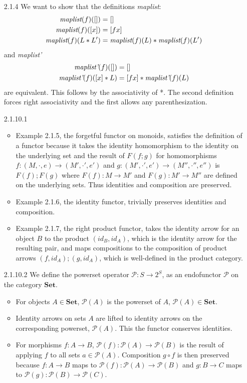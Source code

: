 \documentclass{article}
\newcommand{\pow}{\mathcal{P}}
\newcommand{\fpow}{\mathbf{\mathcal{P}}}
\newcommand{\cset}{\mathbf{Set}}
\begin{document}
\begin{enumerate}
\item[2.1.4]
  We want to show that the definitions \emph{maplist}:
  \begin{align*}
    \emph{maplist}(f)([]) &= []
    \\ \emph{maplist}(f)([x]) &= [f x]
    \\ \emph{maplist}(f)(L * L') &= \emph{maplist}(f)(L) * \emph{maplist}(f)(L')
  \end{align*}
  and \emph{maplist'}
  \begin{align*}
    \emph{maplist'}(f)([]) &= []
    \\ \emph{maplist'}(f)([x] * L) &= [f x] * \emph{maplist'}(f)(L)
  \end{align*}
  are equivalent.
  This follows by the associativity of *.
  The second definition forces right associativity and the first allows any parenthesization.

\item[2.1.10.1]
  \begin{itemize}
  \item Example 2.1.5, the forgetful functor on monoids, satisfies the definition of a functor because it takes the identity homomorphism to the identity on the underlying set and the result of $F (f;g)$ for homomorphisms $f : (M,\cdot,e) \rightarrow (M',\cdot',e')$ and $g : (M',\cdot', e') \rightarrow (M'',\cdot'',e'')$ is $F(f); F(g)$ where $F(f) : M \rightarrow M'$ and $F(g) : M' \rightarrow M''$ are defined on the underlying sets. 
    Thus identities and composition are preserved.
  \item Example 2.1.6, the identity functor, trivially preserves identities and composition.
  \item Example 2.1.7, the right product functor, takes the identity arrow for an object $B$ to the product $(id_B, id_A)$, which is the identity arrow for the resulting pair, and maps compositions to the composition of product arrows $(f,id_A); (g,id_A)$, which is well-defined in the product category.
  \end{itemize}

\item[]
\item [2.1.10.2]
  We define the powerset operator $\pow : S \rightarrow 2^S$, as an endofunctor $\fpow$ on the category $\cset$.
  \begin{itemize}
  \item For objects $A \in \cset$, $\fpow(A)$ is the powerset of $A$, $\pow(A) \in \cset$.
  \item Identity arrows on sets $A$ are lifted to identity arrows on the corresponding powerset, $\pow(A)$.
    This the functor conserves identities.
  \item For morphisms $f : A \rightarrow B$, $\fpow(f) : \pow(A) \rightarrow \pow(B)$ is the result of applying $f$ to all sets $a \in \pow(A)$.
    Composition $g \circ f$ is then preserved because $f : A \rightarrow B$ maps to $\fpow(f) : \pow(A) \rightarrow \pow(B)$ and $g : B \rightarrow C$ maps to $\fpow(g) : \pow(B) \rightarrow \pow(C)$.
  \end{itemize}


\end{enumerate}
\end{document}
